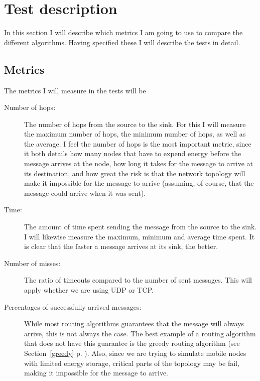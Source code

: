 \section{Test description}
\label{section:test_description}

In this section I will describe which metrics I am going to use to compare the different algorithms. Having specified these I will describe the tests in detail.

\subsection{Metrics}

The metrics I will measure in the tests will be 
\begin{description}
\item[Number of hops:] The number of hops from the source to the sink. For this I will measure the maximum number of hops, the minimum number of hops, as well as the average. I feel the number of hops is the most important metric, since it both details how many nodes that have to expend energy before the message arrives at the node, how long it takes for the message to arrive at its destination, and how great the risk is that the network topology will make it impossible for the message to arrive (assuming, of course, that the message could arrive when it was sent).

\item[Time:] The amount of time spent sending the message from the source to the sink. I will likewise measure the maximum, minimum and average time spent. It is clear that the faster a message arrives at its sink, the better.

\item[Number of misses:] The ratio of timeouts compared to the number of sent messages. This will apply whether we are using UDP or TCP. 

\item[Percentages of successfully arrived messages:] While most routing algorithms guarantees that the message will always arrive, this is not always the case. The best example of a routing algorithm that does not have this guarantee is the greedy routing algorithm (see Section~\ref{greedy} p. \pageref{greedy}). Also, since we are trying to simulate mobile nodes with limited energy storage, critical parts of the topology may be fail, making it impossible for the message to arrive.
\end{description}

